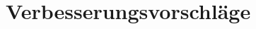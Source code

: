 \documentclass[a4paper,10pt]{scrartcl}
\begin{document}





\section{Verbesserungsvorschläge}
\end{document}
